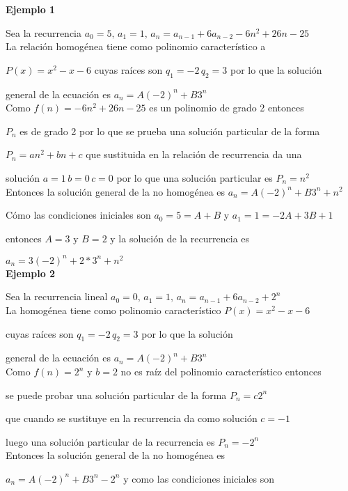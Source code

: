 \documentclass[a4paper,12pt]{report}
\begin{document}
\textbf{Ejemplo 1}

Sea la recurrencia $a_0=5,\, a_1=1,\, a_n=a_{n-1}+6a_{n-2}-6n^2+26n-25$\\

La relación homogénea tiene como polinomio característico a

$P(x)=x^2-x-6$  cuyas raíces son $q_1=-2\, q_2=3$ por lo que la solución 

general de la ecuación es  $a_n=A(-2)^n+B3^n$\\

Como $f(n)=-6n^2+26n-25$ es un polinomio de grado 2 entonces 

$P_n$ es de grado 2 por lo que se prueba una solución particular de la forma 

$P_n=an^2+bn+c$ que sustituida en la relación de recurrencia da una 

solución $a=1\, b=0\, c=0$ por lo que una solución particular es $P_n=n^2$\\

Entonces la solución general de la no homogénea es $a_n=A(-2)^n+B3^n+n^2$

Cómo las condiciones iniciales son $a_0=5=A+B$ y $a_1=1=-2A+3B+1$ 

entonces $A=3$ y $B=2$ y la solución de la recurrencia es 

$a_n=3(-2)^n+2*3^n+n^2$\\

\textbf{Ejemplo 2}

Sea la recurrencia lineal $a_0=0,\, a_1=1,\, a_n=a_{n-1}+6a_{n-2}+2^n$\\

La homogénea tiene como polinomio característico $P(x)=x^2-x-6$ 

cuyas raíces son $q_1=-2\, q_2=3$ por lo que la solución 

general de la ecuación es  $a_n=A(-2)^n+B3^n$\\

Como $f(n)=2^n$ y  $b=2$ no es raíz del polinomio característico entonces 

se puede probar una solución particular de la forma $P_n=c2^n$

que cuando se sustituye en la recurrencia da como solución $c=-1$

luego una solución particular de la recurrencia es $P_n=-2^n$\\

Entonces la solución general de la no homogénea es 

$a_n=A(-2)^n+B3^n-2^n$ y como las condiciones iniciales son 
\end{document}
